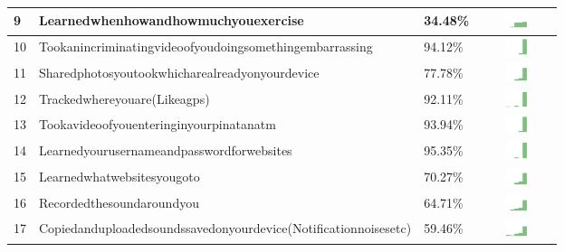 \begin{table}[t]
\begin{center}
\begin{tabular}{| p{0.5cm} | p{7cm} | p{1cm} | c |}
9 & Learnedwhenhowandhowmuchyouexercise & 34.48\% & \includegraphics[width = 2cm, height = 0.5cm]{../learnedwhenhowandhowmuchyouexercisePUBLIC} \\ \hline 
10 & Tookanincriminatingvideoofyoudoingsomethingembarrassing & 94.12\% & \includegraphics[width = 2cm, height = 0.5cm]{../tookanincriminatingvideoofyoudoingsomethingembarrassingPUBLIC} \\ \hline 
11 & Sharedphotosyoutookwhicharealreadyonyourdevice & 77.78\% & \includegraphics[width = 2cm, height = 0.5cm]{../sharedphotosyoutookwhicharealreadyonyourdevicePUBLIC} \\ \hline 
12 & Trackedwhereyouare(Likeagps) & 92.11\% & \includegraphics[width = 2cm, height = 0.5cm]{../trackedwhereyouare(likeaGPS)PUBLIC} \\ \hline 
13 & Tookavideoofyouenteringinyourpinatanatm & 93.94\% & \includegraphics[width = 2cm, height = 0.5cm]{../tookavideoofyouenteringinyourPINatanATMPUBLIC} \\ \hline 
14 & Learnedyourusernameandpasswordforwebsites & 95.35\% & \includegraphics[width = 2cm, height = 0.5cm]{../learnedyourusernameandpasswordforwebsitesPUBLIC} \\ \hline 
15 & Learnedwhatwebsitesyougoto & 70.27\% & \includegraphics[width = 2cm, height = 0.5cm]{../learnedwhatwebsitesyougotoPUBLIC} \\ \hline 
16 & Recordedthesoundaroundyou & 64.71\% & \includegraphics[width = 2cm, height = 0.5cm]{../recordedthesoundaroundyouPUBLIC} \\ \hline 
17 & Copiedanduploadedsoundssavedonyourdevice(Notificationnoisesetc) & 59.46\% & \includegraphics[width = 2cm, height = 0.5cm]{../copiedanduploadedsoundssavedonyourdevice(notificationnoisesetc)PUBLIC} \\ \hline 

\end{tabular}
\end{center}
\end{table}
